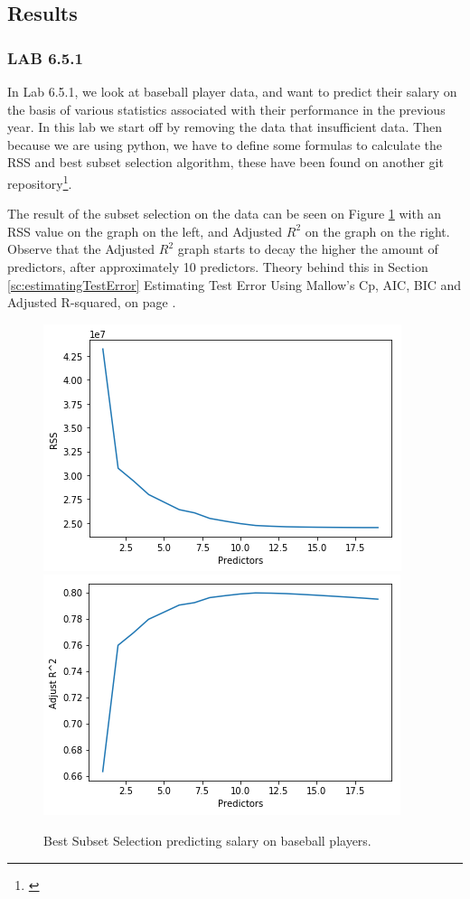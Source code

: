 \subsection{Results}
\subsubsection*{LAB 6.5.1}%
In Lab 6.5.1, we look at baseball player data, and want to predict their salary on the basis of various statistics associated with their performance in the previous year. In this lab we start off by removing the data that insufficient data. Then because we are using python, we have to define some formulas to calculate the RSS and best subset selection algorithm, these have been found on another git repository\footnote{\cite{Xu2017}}.

The result of the subset selection on the data can be seen on Figure \ref{fig:bestSubsetSelection} with an RSS value on the graph on the left, and Adjusted $R^2$ on the graph on the right. Observe that the Adjusted $R^2$ graph starts to decay the higher the  amount of predictors, after approximately 10 predictors. Theory behind this in Section \ref{sc:estimatingTestError} Estimating Test Error Using Mallow's Cp, AIC, BIC and Adjusted R-squared, on page \pageref{sc:estimatingTestError}.

\begin{figure}[h]
	\centering
	\includegraphics[scale=0.5]{subsetSelection/selectionMethods/fig/bestSubsetSelectionRSS.png}
	\includegraphics[scale=0.5]{subsetSelection/selectionMethods/fig/bestSubsetSelectionRsquared.png}
	\caption{Best Subset Selection predicting salary on baseball players.}
	\label{fig:bestSubsetSelection}
\end{figure}


